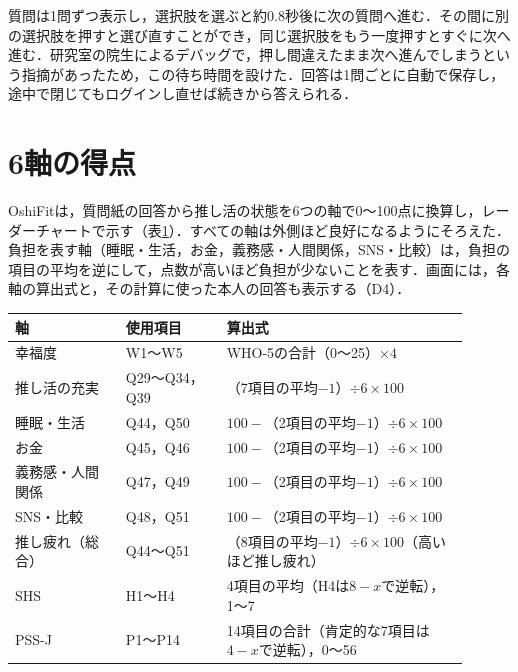 質問は1問ずつ表示し，選択肢を選ぶと約0.8秒後に次の質問へ進む．その間に別の選択肢を押すと選び直すことができ，同じ選択肢をもう一度押すとすぐに次へ進む．研究室の院生によるデバッグで，押し間違えたまま次へ進んでしまうという指摘があったため，この待ち時間を設けた．回答は1問ごとに自動で保存し，途中で閉じてもログインし直せば続きから答えられる．

\section{6軸の得点}
OshiFitは，質問紙の回答から推し活の状態を6つの軸で0〜100点に換算し，レーダーチャートで示す（表\ref{tab:axes}）．すべての軸は外側ほど良好になるようにそろえた．負担を表す軸（睡眠・生活，お金，義務感・人間関係，SNS・比較）は，負担の項目の平均を逆にして，点数が高いほど負担が少ないことを表す．画面には，各軸の算出式と，その計算に使った本人の回答も表示する（D4）．

\begin{table}[t]
\centering
{}
\label{tab:axes}
\small
\begin{tabular}{@{}p{0.22\linewidth}p{0.2\linewidth}p{0.48\linewidth}@{}}
\toprule
軸 & 使用項目 & 算出式 \\
\midrule
幸福度 & W1〜W5 & WHO-5の合計（0〜25）$\times4$ \\
推し活の充実 & Q29〜Q34，Q39 & （7項目の平均$-1$）$\div6\times100$ \\
睡眠・生活 & Q44，Q50 & $100-$（2項目の平均$-1$）$\div6\times100$ \\
お金 & Q45，Q46 & $100-$（2項目の平均$-1$）$\div6\times100$ \\
義務感・人間関係 & Q47，Q49 & $100-$（2項目の平均$-1$）$\div6\times100$ \\
SNS・比較 & Q48，Q51 & $100-$（2項目の平均$-1$）$\div6\times100$ \\
\midrule
推し疲れ（総合） & Q44〜Q51 & （8項目の平均$-1$）$\div6\times100$（高いほど推し疲れ） \\
SHS & H1〜H4 & 4項目の平均（H4は$8-x$で逆転），1〜7 \\
PSS-J & P1〜P14 & 14項目の合計（肯定的な7項目は$4-x$で逆転），0〜56 \\
\bottomrule
\end{tabular}
\end{table}

